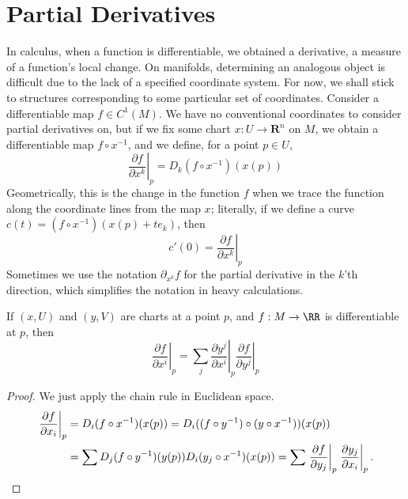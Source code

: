 \section{Partial Derivatives}

In calculus, when a function is differentiable, we obtained a derivative, a measure of a function's local change. On manifolds, determining an analogous object is difficult due to the lack of a specified coordinate system. For now, we shall stick to structures corresponding to some particular set of coordinates. Consider a differentiable map $f \in C^1(M)$. We have no conventional coordinates to consider partial derivatives on, but if we fix some chart $x:U \to \mathbf{R}^n$ on $M$, we obtain a differentiable map $f \circ x^{-1}$, and we define, for a point $p \in U$,
%
\[ \left. \frac{\partial f}{\partial x^k} \right|_p = D_k(f \circ x^{-1})(x(p)) \]
%
Geometrically, this is the change in the function $f$ when we trace the function along the coordinate lines from the map $x$; literally, if we define a curve $c(t) = (f \circ x^{-1})(x(p) + te_k)$, then
%
\[ c'(0) = \left.\frac{\partial f}{\partial x^k}\right|_p \]
%
Sometimes we use the notation $\partial_{x^k} f$ for the partial derivative in the $k$'th direction, which simplifies the notation in heavy calculations.

\begin{theorem}
    If $(x,U)$ and $(y,V)$ are charts at a point $p$, and $f: M \to \RR$ is differentiable at $p$, then
    \[ \left. \frac{\partial f}{\partial x^i} \right|_p = \sum_j \left. \frac{\partial y^j}{\partial x^i} \right|_p \left. \frac{\partial f}{\partial y^j} \right|_p \]
\end{theorem}
\begin{proof}
    We just apply the chain rule in Euclidean space.
    \begin{align*}
        \left.\frac{\partial f}{\partial x_i}\right|_p &= D_i(f \circ x^{-1})(x(p)) = D_i((f \circ y^{-1}) \circ (y \circ x^{-1}))(x(p))\\
        &= \sum D_j(f \circ y^{-1})(y(p)) D_i(y_j \circ x^{-1})(x(p)) = \sum \left.\frac{\partial f}{\partial y_j}\right|_p \left.\frac{\partial y_j}{\partial x_i}\right|_p. \qedhere
    \end{align*}
\end{proof}


